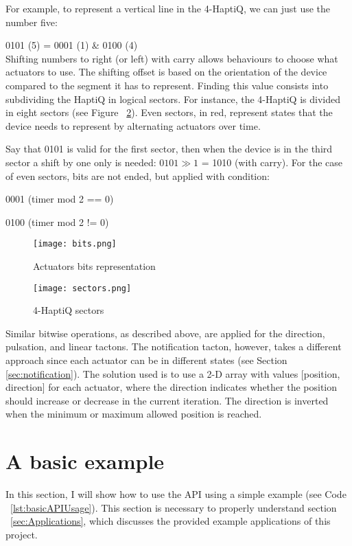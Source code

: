 For example, to represent a vertical line in the 4-HaptiQ, we can just use the number five:

		0101 (5) = 0001 (1) \& 0100 (4) \\
Shifting numbers to right (or left) with carry allows behaviours to choose what actuators to use. 
The shifting offset is based on the orientation of the device compared to the segment it has to represent. Finding this value consists into subdividing the HaptiQ in logical sectors. For instance, the 4-HaptiQ is divided in eight sectors (see Figure ~\ref{fig:sectors}). Even sectors, in red, represent states that the device needs to represent by alternating actuators over time.

Say that 0101 is valid for the first sector, then when the device is in the third sector a shift by one only is needed: $0101 \gg 1$ = 1010 (with carry). For the case of even sectors, bits are not ended, but applied with condition:

		0001 (timer mod 2 == 0)
        
        0100 (timer mod 2 != 0)

\begin{figure}[H]
  \centering
  \texttt{[image: bits.png]}
  \caption{Actuators bits representation}
  \label{fig:bits}
\end{figure}

\begin{figure}[H]
  \centering
  \texttt{[image: sectors.png]}
  \caption{4-HaptiQ sectors}
  \label{fig:sectors}
\end{figure}

Similar bitwise operations, as described above, are applied for the direction, pulsation, and linear tactons. The notification tacton, however, takes a different approach since each actuator can be in different states (see Section \ref{sec:notification}). The solution used is to use a 2-D array with values [position, direction] for each actuator, where the direction indicates whether the position should increase or decrease in the current iteration. The direction is inverted when the minimum or maximum allowed position is reached.  

\section{A basic example}

In this section, I will show how to use the API using a simple example (see Code ~\ref{lst:basicAPIUsage}). This section is necessary to properly understand section ~\ref{sec:Applications}, which discusses the provided example applications of this project.

